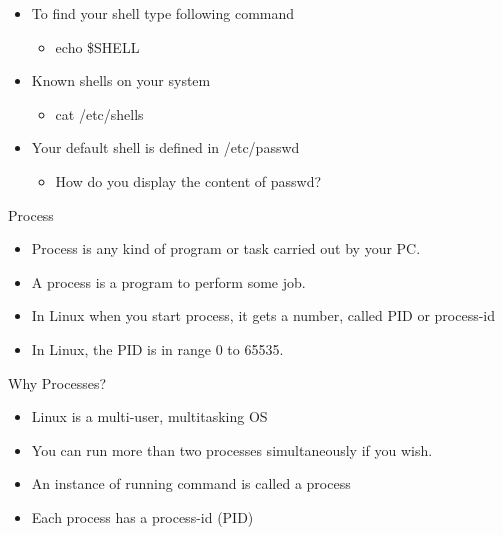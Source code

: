 \documentclass{beamer}
\begin{document}
\begin{frame}{}
\begin{itemize}
\item To find your shell type following command
\begin{itemize}
\item echo \$SHELL
\end{itemize}
\item Known shells on your system
\begin{itemize}
\item cat /etc/shells
\end{itemize}
\item Your default shell is defined in /etc/passwd
\begin{itemize}
\item How do you display the content of passwd?
\end{itemize}
\end{itemize}
\end{frame}

\begin{frame}{Process}
\begin{itemize}
\item Process is any kind of program or task carried out by your PC.
\item A process is a program to perform some job.
\item In Linux when you start process, it gets a number, called PID or process-id
\item In Linux, the PID is in range 0 to 65535.
\end{itemize}
\end{frame}

\begin{frame}{Why Processes?}
\begin{itemize}
\item Linux is a multi-user, multitasking OS
\item You can run more than two processes simultaneously if you wish.
\item An instance of running command is called a process
\item Each process has a process-id (PID)
\end{itemize}
\end{frame}
\end{document}
